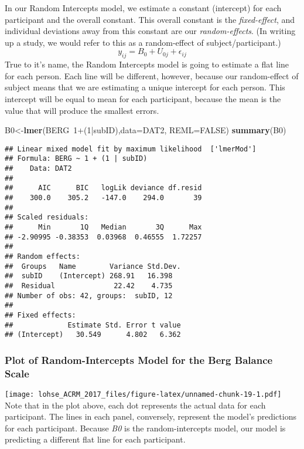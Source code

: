 \documentclass[]{article}
\newenvironment{Shaded}{\begin{snugshade}}{\end{snugshade}}
\newcommand{\KeywordTok}[1]{\textcolor[rgb]{0.13,0.29,0.53}{\textbf{{#1}}}}
\newcommand{\DataTypeTok}[1]{\textcolor[rgb]{0.13,0.29,0.53}{{#1}}}
\newcommand{\DecValTok}[1]{\textcolor[rgb]{0.00,0.00,0.81}{{#1}}}
\newcommand{\OtherTok}[1]{\textcolor[rgb]{0.56,0.35,0.01}{{#1}}}
\newcommand{\NormalTok}[1]{{#1}}
\begin{document}
In our Random Intercepts model, we estimate a constant (intercept) for
each participant and the overall constant. This overall constant is the
\emph{fixed-effect}, and individual deviations away from this constant
are our \emph{random-effects}. (In writing up a study, we would refer to
this as a random-effect of subject/participant.)
\[y_{ij} = B_0 + U_{0j} + \epsilon_{ij}\] True to it's name, the Random
Intercepts model is going to estimate a flat line for each person. Each
line will be different, however, because our random-effect of subject
means that we are estimating a unique intercept for each person. This
intercept will be equal to mean for each participant, because the mean
is the value that will produce the smallest errors.

\begin{Shaded}
\begin{Highlighting}[]
\NormalTok{B0<-}\KeywordTok{lmer}\NormalTok{(BERG~}\DecValTok{1}\NormalTok{+(}\DecValTok{1}\NormalTok{|subID),}\DataTypeTok{data=}\NormalTok{DAT2, }\DataTypeTok{REML=}\OtherTok{FALSE}\NormalTok{)}
\KeywordTok{summary}\NormalTok{(B0)}
\end{Highlighting}
\end{Shaded}

\begin{verbatim}
## Linear mixed model fit by maximum likelihood  ['lmerMod']
## Formula: BERG ~ 1 + (1 | subID)
##    Data: DAT2
## 
##      AIC      BIC   logLik deviance df.resid 
##    300.0    305.2   -147.0    294.0       39 
## 
## Scaled residuals: 
##      Min       1Q   Median       3Q      Max 
## -2.90995 -0.38353  0.03968  0.46555  1.72257 
## 
## Random effects:
##  Groups   Name        Variance Std.Dev.
##  subID    (Intercept) 268.91   16.398  
##  Residual              22.42    4.735  
## Number of obs: 42, groups:  subID, 12
## 
## Fixed effects:
##             Estimate Std. Error t value
## (Intercept)   30.549      4.802   6.362
\end{verbatim}

\newpage

\subsubsection{Plot of Random-Intercepts Model for the Berg Balance
Scale}\label{plot-of-random-intercepts-model-for-the-berg-balance-scale}

\texttt{[image: lohse\_ACRM\_2017\_files/figure-latex/unnamed-chunk-19-1.pdf]}
Note that in the plot above, each dot represents the actual data for
each participant. The lines in each panel, conversely, represent the
model's predictions for each participant. Because \emph{B0} is the
random-intercepts model, our model is predicting a different flat line
for each participant.
\end{document}
